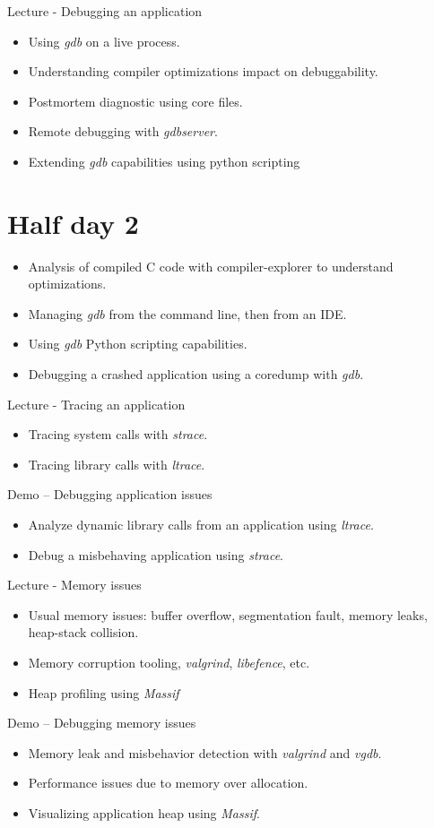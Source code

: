 \documentclass[a4paper,12pt,obeyspaces,spaces,hyphens]{article}
\begin{document}
\feagendaonecolumn
{Lecture - Debugging an application}
{
  \begin{itemize}
  \item Using {\em gdb} on a live process.
  \item Understanding compiler optimizations impact on debuggability.
  \item Postmortem diagnostic using core files.
  \item Remote debugging with {\em gdbserver}.
  \item Extending {\em gdb} capabilities using python scripting
  \end{itemize}
}

\section{Half day 2}

{
  \begin{itemize}
  \item Analysis of compiled C code with compiler-explorer to understand
    optimizations.
  \item Managing {\em gdb} from the command line, then from an IDE.
  \item Using {\em gdb} Python scripting capabilities.
  \item Debugging a crashed application using a coredump with {\em gdb}.
  \end{itemize}
}

\feagendatwocolumn
{Lecture - Tracing an application}
{
  \begin{itemize}
  \item Tracing system calls with {\em strace}.
  \item Tracing library calls with {\em ltrace}.
  \end{itemize}
}
{Demo – Debugging application issues}
{
  \begin{itemize}
  \item Analyze dynamic library calls from an application using
    {\em ltrace}.
  \item Debug a misbehaving application using {\em strace}.
  \end{itemize}
}

\feagendatwocolumn
{Lecture - Memory issues}
{
  \begin{itemize}
  \item Usual memory issues: buffer overflow, segmentation fault,
    memory leaks, heap-stack collision.
  \item Memory corruption tooling, {\em valgrind}, {\em libefence},
    etc.
  \item Heap profiling using {\em Massif}
  \end{itemize}
}
{Demo – Debugging memory issues}
{
  \begin{itemize}
  \item Memory leak and misbehavior detection with {\em valgrind} and
    {\em vgdb}.
  \item Performance issues due to memory over allocation.
  \item Visualizing application heap using {\em Massif}.
  \end{itemize}
}
\end{document}
